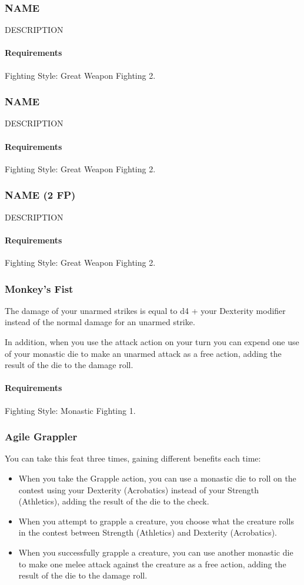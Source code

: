 \subsubsection{NAME} \label{feat::name}
    DESCRIPTION
    \paragraph{Requirements} Fighting Style: Great Weapon Fighting 2.
\subsubsection{NAME} \label{feat::name}
    DESCRIPTION
    \paragraph{Requirements} Fighting Style: Great Weapon Fighting 2.
\subsubsection{NAME (2 FP)} \label{feat::name}
    DESCRIPTION
    \paragraph{Requirements} Fighting Style: Great Weapon Fighting 2.
\subsubsection{Monkey's Fist} \label{feat::monkeysfist}
    The damage of your unarmed strikes is equal to d4 + your Dexterity modifier instead of the normal damage for an unarmed strike.

    In addition, when you use the attack action on your turn you can expend one use of your monastic die to make an unarmed attack as a free action, adding the result of the die to the damage roll.
    \paragraph{Requirements} Fighting Style: Monastic Fighting 1.
\subsubsection{Agile Grappler} \label{feat::agilegrappler}
    You can take this feat three times, gaining different benefits each time:
    \begin{itemize}
        \item When you take the Grapple action, you can use a monastic die to roll on the contest using your Dexterity (Acrobatics) instead of your Strength (Athletics), adding the result of the die to the check.
        \item When you attempt to grapple a creature, you choose what the creature rolls in the contest between Strength (Athletics) and Dexterity (Acrobatics).
        \item When you successfully grapple a creature, you can use another monastic die to make one melee attack against the creature as a free action, adding the result of the die to the damage roll.
    \end{itemize}
